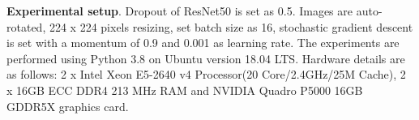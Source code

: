 \documentclass[preprint,12pt]{elsarticle}
\begin{document}




\textbf{Experimental setup}. Dropout of ResNet50 is set as 0.5. Images are auto-rotated, 224 x 224 pixels resizing, set batch size as 16, stochastic gradient descent is set with a momentum of 0.9 and 0.001 as learning rate. The experiments are performed using Python 3.8 on Ubuntu version 18.04 LTS. Hardware details are as follows: 2 x Intel Xeon E5-2640 v4 Processor(20 Core/2.4GHz/25M Cache), 2 x 16GB ECC DDR4 213 MHz RAM and NVIDIA Quadro P5000 16GB GDDR5X graphics card.



\end{document}
